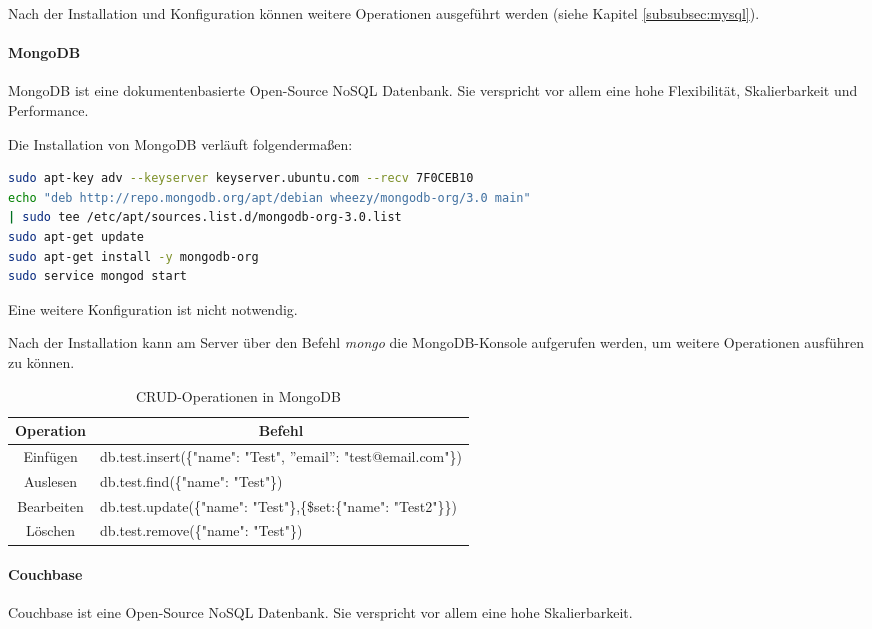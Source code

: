 Nach der Installation und Konfiguration können weitere Operationen ausgeführt werden (siehe Kapitel \ref{subsubsec:mysql}).

\newpage

\paragraph{MongoDB}
MongoDB ist eine dokumentenbasierte Open-Source NoSQL Datenbank. Sie verspricht vor allem eine hohe Flexibilität, Skalierbarkeit und Performance. \cite{ABOUTMONGODB}

Die Installation von MongoDB verläuft folgendermaßen:
\begin{lstlisting}[caption=Installation von MongoDB \cite{MONGODBINSTALL}, language=bash]
sudo apt-key adv --keyserver keyserver.ubuntu.com --recv 7F0CEB10
echo "deb http://repo.mongodb.org/apt/debian wheezy/mongodb-org/3.0 main" 
| sudo tee /etc/apt/sources.list.d/mongodb-org-3.0.list
sudo apt-get update
sudo apt-get install -y mongodb-org
sudo service mongod start
\end{lstlisting}
Eine weitere Konfiguration ist nicht notwendig.

Nach der Installation kann am Server über den Befehl \textit{mongo}  die MongoDB-Konsole aufgerufen werden, um weitere Operationen ausführen zu können.

\begin{table}[htb]
\def\arraystretch{1.3}
\centering
\begin{tabular}{|c|l|}
\hline
\textbf{Operation} & \multicolumn{1}{c|}{\textbf{Befehl}}                            \\ \hline
Einfügen           & db.test.insert(\{"name": "Test", ''email'': "test@email.com"\})                    \\ \hline
Auslesen           & db.test.find(\{"name": "Test"\}) \\ \hline
Bearbeiten         & db.test.update(\{"name": "Test"\},\{\$set:\{"name": "Test2"\}\}) \\ \hline
Löschen            & db.test.remove(\{"name": "Test"\}) \\ \hline
\end{tabular}
\caption{CRUD-Operationen in MongoDB}
\end{table}

\newpage

\paragraph{Couchbase}
Couchbase ist eine Open-Source NoSQL Datenbank. Sie verspricht vor allem eine hohe Skalierbarkeit.\cite{ABOUTCOUCHBASE}

